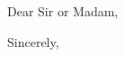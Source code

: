 \documentclass[11pt,a4paper,sans]{moderncv}        %
\begin{document}
\recipient{}{}
\date{May 13, 2017}
\opening{Dear Sir or Madam,}
\closing{Sincerely,}
\makelettertitle

\makeletterclosing
\end{document}
